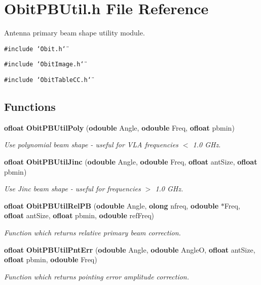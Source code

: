 \section{Obit\-PBUtil.h File Reference}
\label{ObitPBUtil_8h}
Antenna primary beam shape utility module. 

{\tt \#include \char`\"{}Obit.h\char`\"{}}\par
{\tt \#include \char`\"{}Obit\-Image.h\char`\"{}}\par
{\tt \#include \char`\"{}Obit\-Table\-CC.h\char`\"{}}\par
\subsection*{Functions}
\begin{CompactItemize}
\item 
{\bf ofloat} {\bf Obit\-PBUtil\-Poly} ({\bf odouble} Angle, {\bf odouble} Freq, {\bf ofloat} pbmin)
\begin{CompactList}\small\item\em Use polynomial beam shape - useful for VLA frequencies $<$ 1.0 GHz. \item\end{CompactList}\item 
{\bf ofloat} {\bf Obit\-PBUtil\-Jinc} ({\bf odouble} Angle, {\bf odouble} Freq, {\bf ofloat} ant\-Size, {\bf ofloat} pbmin)
\begin{CompactList}\small\item\em Use Jinc beam shape - useful for frequencies $>$ 1.0 GHz. \item\end{CompactList}\item 
{\bf ofloat} {\bf Obit\-PBUtil\-Rel\-PB} ({\bf odouble} Angle, {\bf olong} nfreq, {\bf odouble} $\ast$Freq, {\bf ofloat} ant\-Size, {\bf ofloat} pbmin, {\bf odouble} ref\-Freq)
\begin{CompactList}\small\item\em Function which returns relative primary beam correction. \item\end{CompactList}\item 
{\bf ofloat} {\bf Obit\-PBUtil\-Pnt\-Err} ({\bf odouble} Angle, {\bf odouble} Angle\-O, {\bf ofloat} ant\-Size, {\bf ofloat} pbmin, {\bf odouble} Freq)
\begin{CompactList}\small\item\em Function which returns pointing error amplitude correction. \item\end{CompactList}\item 

\end{CompactItemize}

